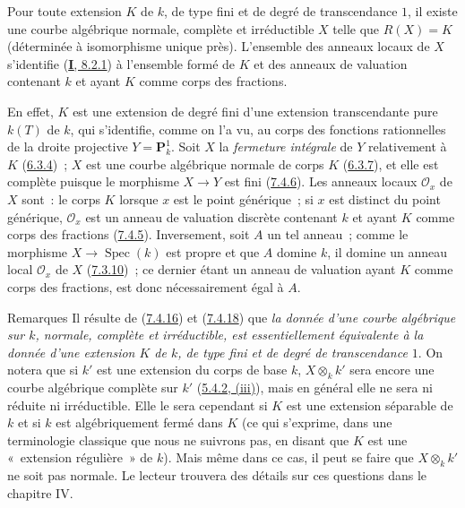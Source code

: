 \begin{proposition}[7.4.18]
\label{II.7.4.18-fr}
Pour toute extension $K$ de $k$, de type fini et de degré de transcendance
$1$, il existe une courbe algébrique normale, complète et irréductible $X$
telle que $R(X)=K$ (déterminée à isomorphisme unique près). L'ensemble des
anneaux locaux de $X$ s'identifie \textup{(\hyperref[I.8.2.1-fr]{\textbf{I}, 8.2.1})} à
l'ensemble formé de $K$ et des anneaux de valuation contenant $k$ et ayant
$K$ comme corps des fractions.
\end{proposition}

En effet, $K$ est une extension de degré fini d'une extension transcendante
pure $k(T)$ de $k$, qui s'identifie, comme on l'a vu, au corps des fonctions
rationnelles de la droite projective $Y=\mathbf{P}_k^1$. Soit $X$ la
\emph{fermeture intégrale} de $Y$ relativement à $K$
(\hyperref[II.6.3.4-fr]{6.3.4})~; $X$ est une courbe algébrique normale de
corps $K$ (\hyperref[II.6.3.7-fr]{6.3.7}), et elle est complète puisque le
morphisme $X\to Y$ est fini (\hyperref[II.7.4.6-fr]{7.4.6}). Les anneaux
locaux $\mathcal{O}_x$ de $X$ sont~: le corps $K$ lorsque $x$ est le point
générique~; si $x$ est distinct du point générique, $\mathcal{O}_x$ est un
anneau de valuation discrète contenant $k$ et ayant $K$ comme corps des
fractions (\hyperref[II.7.4.5-fr]{7.4.5}). Inversement, soit $A$ un tel
anneau~; comme le morphisme $X\to\operatorname{Spec}(k)$ est propre et que
$A$ domine $k$, il domine un anneau local $\mathcal{O}_x$ de $X$
(\hyperref[II.7.3.10-fr]{7.3.10})~; ce dernier étant un anneau de valuation
ayant $K$ comme corps des fractions, est donc nécessairement égal à $A$.

\begin{namedtheorem}[7.4.19]{Remarques}
\label{II.7.4.19-fr}
Il résulte de (\hyperref[II.7.4.16-fr]{7.4.16}) et
(\hyperref[II.7.4.18-fr]{7.4.18}) que \emph{la donnée d'une courbe algébrique
sur $k$, normale, complète et irréductible, est essentiellement équivalente à
la donnée d'une extension $K$ de $k$, de type fini et de degré de
transcendance $1$}. On notera que si $k'$ est une extension du corps de base
$k$, $X\otimes_k k'$ sera encore une courbe algébrique complète sur $k'$
(\hyperref[II.5.4.2-fr]{5.4.2, (iii)}), mais en général elle ne sera ni réduite
ni irréductible. Elle le sera cependant si $K$ est une extension séparable de
$k$ et si $k$ est algébriquement fermé dans $K$ (ce qui s'exprime, dans une
terminologie classique que nous ne suivrons pas, en disant que $K$ est une
«~extension régulière~» de $k$). Mais même dans ce cas, il peut se faire que
$X\otimes_k k'$ ne soit pas normale. Le lecteur trouvera des détails sur ces
questions dans le chapitre IV.
\end{namedtheorem}

